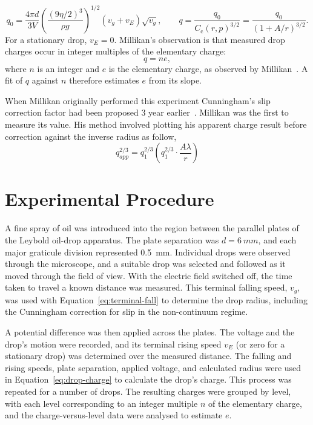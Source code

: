 \documentclass[12pt,a4paper]{article}
\begin{document}
\begin{equation}
    q_0 = \frac{4\pi d}{3V}
    \left(\frac{(9\eta/2)^3}{\rho g}\right)^{1/2}
    (v_g+v_E)\sqrt{v_g},
    \qquad
    q = \frac{q_0}{C_{\mathrm{c}}(r,p)^{3/2}}
    = \frac{q_0}{(1+A/r)^{3/2}}.
    \label{eq:drop-charge}
\end{equation}
For a stationary drop, $v_E=0$. Millikan's observation is that measured drop
charges occur in integer multiples of the elementary charge:
\begin{equation}
    q=ne,
\end{equation}
where $n$ is an integer and $e$ is the elementary charge, as observed by
Millikan~\cite{millikan1913}. A fit of $q$ against $n$ therefore estimates
$e$ from its slope.

When Millikan originally performed this experiment Cunningham's slip correction factor had been proposed 3 year earlier~\cite{cunningham1910}. Millikan was the first to measure its value.
His method involved plotting his apparent charge result before correction against the inverse radius as follow,
\begin{equation}
    q_{app}^{2/3} = q_1^{2/3}\left(q_1^{2/3} \cdot \frac{A\lambda}{r}\right)
    \label{eq:millikan-plot}
\end{equation}


\newpage

\section{Experimental Procedure}

A fine spray of oil was introduced into the region between the parallel
plates of the Leybold oil-drop apparatus. The plate separation was
$d=\SI{6}{mm}$, and each major graticule division represented
\SI{0.5}{mm}. Individual drops were observed through the microscope, and a
suitable drop was selected and followed as it moved through the field of
view. With the electric field switched off, the time taken to travel a known
distance was measured. This terminal falling speed, $v_g$, was used with
Equation~\ref{eq:terminal-fall} to determine the drop radius, including the
Cunningham correction for slip in the non-continuum regime.

A potential difference was then applied across the plates. The voltage and
the drop's motion were recorded, and its terminal rising speed $v_E$ (or zero
for a stationary drop) was determined over the measured distance. The falling
and rising speeds, plate separation, applied voltage, and calculated radius
were used in Equation~\ref{eq:drop-charge} to calculate the drop's charge.
This process was repeated for a number of drops. The resulting charges were
grouped by level, with each level corresponding to an integer multiple $n$ of
the elementary charge, and the charge-versus-level data were analysed to
estimate $e$.
\end{document}
